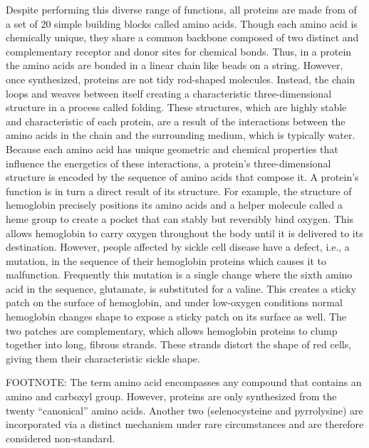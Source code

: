 Despite performing this diverse range of functions, all proteins are made from of a set of 20 simple building blocks called amino acids. Though each amino acid is chemically unique, they share a common backbone composed of two distinct and complementary receptor and donor sites for chemical bonds. Thus, in a protein the amino acids are bonded in a linear chain like beads on a string. However, once synthesized, proteins are not tidy rod-shaped molecules. Instead, the chain loops and weaves between itself creating a characteristic three-dimensional structure in a process called folding. These structures, which are highly stable and characteristic of each protein, are a result of the interactions between the amino acids in the chain and the surrounding medium, which is typically water. Because each amino acid has unique geometric and chemical properties that influence the energetics of these interactions, a protein's three-dimensional structure is encoded by the sequence of amino acids that compose it. A protein's function is in turn a direct result of its structure. For example, the structure of hemoglobin precisely positions its amino acids and a helper molecule called a heme group to create a pocket that can stably but reversibly bind oxygen. This allows hemoglobin to carry oxygen throughout the body until it is delivered to its destination. However, people affected by sickle cell disease have a defect, i.e., a mutation, in the sequence of their hemoglobin proteins which causes it to malfunction. Frequently this mutation is a single change where the sixth amino acid in the sequence, glutamate, is substituted for a valine. This creates a sticky patch on the surface of hemoglobin, and under low-oxygen conditions normal hemoglobin changes shape to expose a sticky patch on its surface as well. The two patches are complementary, which allows hemoglobin proteins to clump together into long, fibrous strands. These strands distort the shape of red cells, giving them their characteristic sickle shape.

FOOTNOTE: The term amino acid encompasses any compound that contains an amino and carboxyl group. However, proteins are only synthesized from the twenty ``canonical'' amino acids. Another two (selenocysteine and pyrrolysine) are incorporated via a distinct mechanism under rare circumstances and are therefore considered non-standard.

